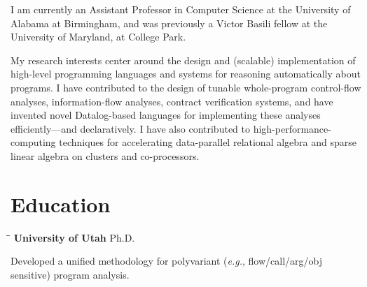 \documentclass[line]{res}
\begin{document}

\address{\bf gilray.org
\ \ \ \ \ \ \ \ }
                                  
\begin{resume}        

\vspace{-0.1in}  
I am currently an Assistant Professor in Computer Science at the University of Alabama at Birmingham, and was previously a Victor Basili fellow at the University of Maryland, at College Park.

My research interests center around the design and (scalable) implementation of high-level programming languages and systems for reasoning automatically about programs. I have contributed to the design of tunable whole-program control-flow analyses, information-flow analyses, contract verification systems, and have invented novel Datalog-based languages for implementing these analyses efficiently---and declaratively. I have also contributed to high-performance-computing techniques for accelerating data-parallel relational algebra and sparse linear algebra on clusters and co-processors.

\section{\large Education}          
    \vspace{-0.1cm}	
    \begin{tabbing}
    \hspace{2.25in}\= \hspace{2.25in}\= \kill %
    {\bf University of Utah} \>Ph.D.     
    \end{tabbing}\vspace{-0.5cm}
    Developed a unified methodology for polyvariant (\textit{e.g.}, flow/call/arg/obj sensitive) program analysis.%
    

\end{resume}
\end{document}
